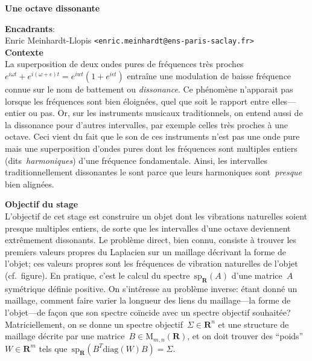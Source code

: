 \documentclass[a4paper,11pt]{article}
\begin{document}
\thispagestyle{empty}

{\bf
	Une octave dissonante
}

{\bf Encadrants}:\\
Enric Meinhardt-Llopis \verb+<enric.meinhardt@ens-paris-saclay.fr>+ \\

{\bf Contexte}\\
La superposition de deux ondes pures de fréquences très proches~$e^{i\omega
t}+e^{i(\omega+\epsilon)t}=e^{iwt}\left(1+e^{i\epsilon t}\right)$
entraîne une modulation de baisse fréquence connue sur le nom de battement ou
\emph{dissonance}.  Ce phénomène n'apparait pas lorsque les fréquences sont
bien éloignées, quel que soit le rapport entre elles---entier ou pas.
Or, sur les instruments musicaux traditionnels, on entend aussi de la
dissonance pour d'autres intervalles, par exemple celles très proches à une
octave.  Ceci vient du fait que le son de ces instruments n'est pas une onde
pure mais une superposition d'ondes pures dont les fréquences sont multiples
entiers (dits~\emph{harmoniques}) d'une fréquence fondamentale.
Ainsi, les intervalles traditionnellement dissonantes le sont parce que leurs
harmoniques sont~\emph{presque} bien alignées.

{\bf Objectif du stage}\\
L'objectif de cet stage est construire un objet dont les vibrations naturelles
soient presque multiples entiers, de sorte que les intervalles d'une octave
deviennent extrêmement dissonants.  Le problème direct, bien connu, consiste à
trouver les premiers valeurs propres du Laplacien sur un maillage décrivant la
forme de l'objet; ces valeurs propres sont les fréquences de vibration
naturelles de l'objet (cf.~figure).  En pratique, c'est le calcul du
spectre~$\mathrm{sp}_{\mathbf{R}}(A)$ d'une matrice~$A$
symétrique définie positive.  On s'intéresse au problème inverse: étant donné un
maillage, comment faire varier la longueur des liens du maillage---la forme de
l'objet---de façon que son spectre coïncide avec un spectre
objectif souhaitée?  Matriciellement, on se donne un spectre
objectif~$\Sigma\in\mathbf{R}^n$ et une structure de maillage décrite par une
matrice~$B\in\mathrm{M}_{m,n}(\mathbf{R})$, et on doit trouver des
``poids''~$W\in\mathbf{R}^m$ tels
que~$\mathrm{sp}_\mathbf{R}\left(B^T\mathrm{diag}(W)B\right)=\Sigma$.
\end{document}
